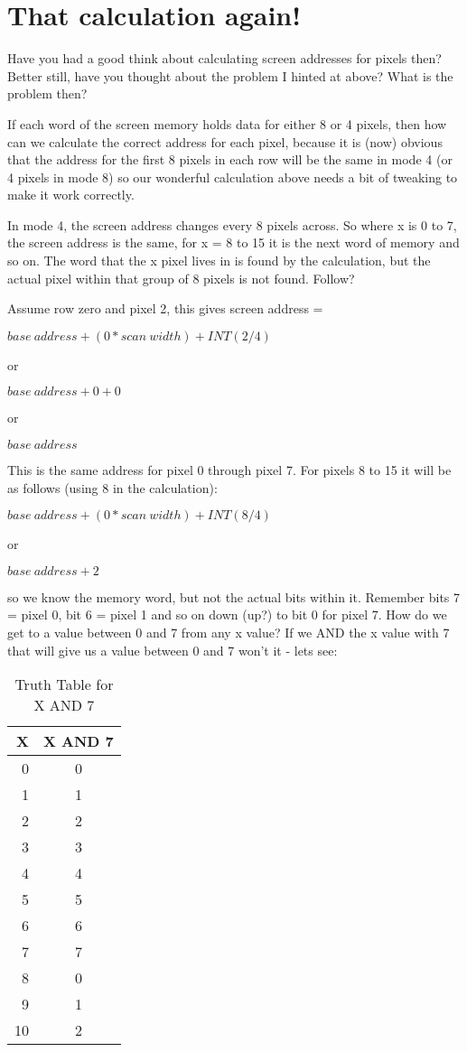 \section{That calculation again!}
\label{ch8-calculation}%

Have you had a good think about calculating screen addresses for
    pixels then? Better still, have you thought about the problem I hinted at
    above? What is the problem then?

If each word of the screen memory holds data for either 8 or 4
    pixels, then how can we calculate the correct address for each pixel,
    because it is (now) obvious that the address for the first 8 pixels in
    each row will be the same in mode 4 (or 4 pixels in mode 8) so our
    wonderful calculation above needs a bit of tweaking to make it work
    correctly.

In mode 4, the screen address changes every 8 pixels across. So
    where x is 0 to 7, the screen address is the same, for x = 8 to 15 it is
    the next word of memory and so on. The word that the x pixel lives in is
    found by the calculation, but the actual pixel within that group of 8
    pixels is not found. Follow?

Assume row zero and pixel 2, this gives screen address =

$base~address + (0 * scan~width) + INT(2 / 4)$

or

$base~address + 0 + 0$

or

$base~address$

This is the same address for pixel 0 through pixel 7. For pixels 8
    to 15 it will be as follows (using 8 in the calculation):

$base~address + (0 * scan~width) + INT(8 / 4)$

or

$base~address + 2$

so we know the memory word, but not the actual bits within it.
    Remember bits 7 = pixel 0, bit 6 = pixel 1 and so on down (up?) to bit 0
    for pixel 7. How do we get to a value between 0 and 7 from any x value? If
    we AND the x value with 7 that will give us a value between 0 and 7 won't
    it -{} lets see:


\begin{table}[htbp]
\centering
\begin{tabular}{r c}
\toprule
\textbf{X} & \textbf{X AND 7} \\
\midrule
%
0 & 0 \\
1 & 1 \\
2 & 2 \\
3 & 3 \\
4 & 4 \\
5 & 5 \\
6 & 6 \\
7 & 7 \\
8 & 0 \\
9 & 1 \\
10 & 2 \\
%
\bottomrule
\end{tabular}
\caption{Truth Table for X AND 7}
\label{tab:TruthTableForXAnd7}
\end{table}

